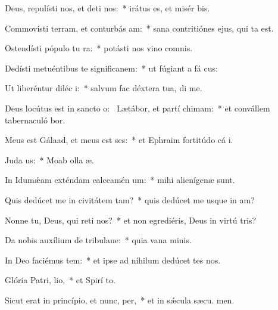 \item Deus, repulísti nos, et deti nos:~* irátus es, et misér  bis.
\item Commovísti terram, et conturbás am:~* sana contritiónes ejus, qui ta est.
\item Ostendísti pópulo tu ra:~* potásti nos vino comnis.
\item Dedísti metuéntibus te significanem:~* ut fúgiant a fá cus:
\item Ut liberéntur diléc i:~* salvum fac déxtera tua,  di me.
\item Deus locútus est in sancto o:~\pscross{} Lætábor, et partí chimam:~* et convállem tabernaculó bor.
\item Meus est Gálaad, et meus est ses:~* et Ephraim fortitúdo cá i.
\item Juda  us:~* Moab olla  æ.
\item In Idumǽam exténdam calceamén um:~* mihi alienígenæ  sunt.
\item Quis dedúcet me in civitátem tam?~* quis dedúcet me usque in am?
\item Nonne tu, Deus, qui reti nos?~* et non egrediéris, Deus in virtú tris?
\item Da nobis auxílium de tribulane:~* quia vana  minis.
\item In Deo faciémus tem:~* et ipse ad níhilum dedúcet tes nos.
\item Glória Patri,  lio,~* et Spirí to.
\item Sicut erat in princípio, et nunc,  per,~* et in sǽcula sæcu. men.
